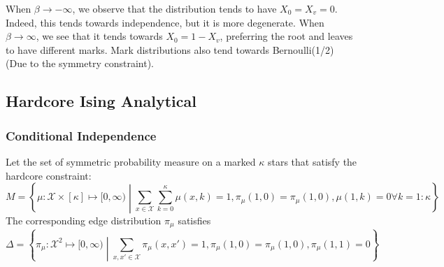 \documentclass[12pt]{article}
\numberwithin{equation}{section}
\begin{document}
When $\beta\rightarrow-\infty$, we observe that the distribution tends to have $X_0=X_v=0$. Indeed, this tends towards independence, but it is more
degenerate. When $\beta\rightarrow\infty$, we see that it tends towards $X_0=1-X_v$, preferring the root and leaves to have different marks.
Mark distributions also tend towards Bernoulli(1/2) (Due to the symmetry constraint).

\newpage

\subsection{Hardcore Ising Analytical}

\subsubsection{Conditional Independence}

Let the set of symmetric probability measure on a marked $\kappa$ stars that satisfy the hardcore constraint:
\begin{equation}
    M = \left\{\mu: \mathcal{X} \times [\kappa] \mapsto [0, \infty) \middle| \sum_{x\in\mathcal{X}}\sum_{k=0}^\kappa \mu(x, k) = 1, \pi_\mu(1, 0) = \pi_\mu(1, 0), \mu(1, k) = 0\forall k=1:\kappa\right\}
\end{equation}
The corresponding edge distribution $\pi_\mu$ satisfies
\begin{equation}
    \Delta = \left\{\pi_\mu: \mathcal{X}^2 \mapsto [0, \infty) \middle| \sum_{x, x'\in\mathcal{X}}\pi_\mu(x, x') = 1, \pi_\mu(1, 0) = \pi_\mu(1, 0), \pi_\mu(1, 1) = 0\right\}
\end{equation}
\end{document}
